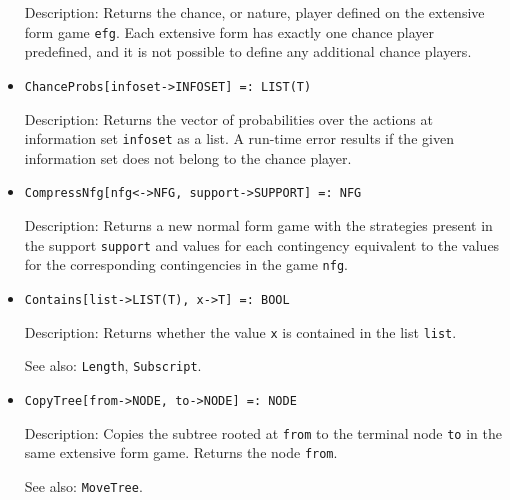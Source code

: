 \begin{itemize}
\bd
\item
[Description:] Returns the chance, or nature, player defined on the
extensive form game \verb+efg+.  Each extensive form has exactly one
chance player predefined, and it is not possible to define any additional
chance players.
\ed

\item
\protect \large \begin{verbatim}
ChanceProbs[infoset->INFOSET] =: LIST(T)
\end{verbatim}\normalsize

\bd
\item
[Description:] Returns the vector of probabilities over the actions at
information set \verb+infoset+ as a list.  A run-time error results if
the given information set does not belong to the chance player.
\ed

\item
\protect \large \begin{verbatim}
CompressNfg[nfg<->NFG, support->SUPPORT] =: NFG
\end{verbatim}\normalsize

\bd
\item
[Description:] Returns a new normal form game with the strategies present
in the support \verb+support+ and values for each contingency equivalent
to the values for the corresponding contingencies in the game \verb+nfg+.
\ed

\item
\protect \large \begin{verbatim}
Contains[list->LIST(T), x->T] =: BOOL
\end{verbatim}\normalsize

\bd
\item
[Description:] Returns whether the value \verb+x+ is contained in the list
\verb+list+.
\item
[See also:] {\tt Length}, {\tt Subscript}.
\ed

\item
\protect \large \begin{verbatim}
CopyTree[from->NODE, to->NODE] =: NODE
\end{verbatim}\normalsize

\bd
\item
[Description:] Copies the subtree rooted at \verb+from+ to the terminal
node \verb+to+ in the same extensive form game.  Returns the node \verb+from+.
\item
[See also:] {\tt MoveTree}.
\ed


\end{itemize}
